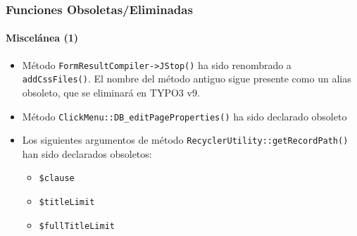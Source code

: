 \begin{frame}[fragile]
	\frametitle{Funciones Obsoletas/Eliminadas}
	\framesubtitle{Miscelánea (1)}

	\begin{itemize}
		\item Método \texttt{FormResultCompiler->JStop()} ha sido renombrado a \texttt{addCssFiles()}.
			El nombre del método antiguo sigue presente como un alias obsoleto, que se eliminará en TYPO3 v9.

		\item Método \texttt{ClickMenu::DB\_editPageProperties()} ha sido declarado obsoleto

		\item Los siguientes argumentos de método \texttt{RecyclerUtility::getRecordPath()} han sido declarados obsoletos:

			\begin{itemize}
				\item \texttt{\$clause}
				\item \texttt{\$titleLimit}
				\item \texttt{\$fullTitleLimit}
			\end{itemize}

	\end{itemize}

\end{frame}


